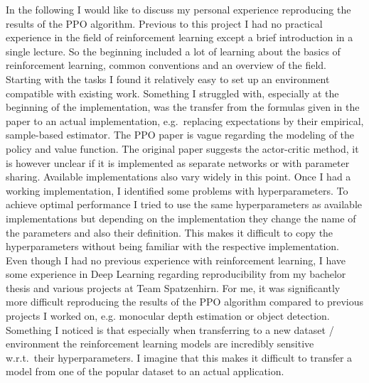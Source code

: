 In the following I would like to discuss my personal experience reproducing the results of the PPO algorithm.
Previous to this project I had no practical experience in the field of reinforcement learning except a brief introduction in a single lecture.
So the beginning included a lot of learning about the basics of reinforcement learning, common conventions and an overview of the field.
Starting with the tasks I found it relatively easy to set up an environment compatible with existing work.
Something I struggled with, especially at the beginning of the implementation, was the transfer from the formulas given in
the paper to an actual implementation, e.g.\ replacing expectations by their empirical, sample-based estimator.
The PPO paper is vague regarding the modeling of the policy and value function.
The original paper suggests the actor-critic method, it is however unclear if it is implemented as separate networks
or with parameter sharing.
Available implementations also vary widely in this point.
Once I had a working implementation, I identified some problems with hyperparameters.
To achieve optimal performance I tried to use the same hyperparameters as available implementations but depending on the
implementation they change the name of the parameters and also their definition.
This makes it difficult to copy the hyperparameters without being familiar with the respective implementation.\\
Even though I had no previous experience with reinforcement learning, I have some experience in Deep Learning
regarding reproducibility from my bachelor thesis and various projects at Team Spatzenhirn.
For me, it was significantly more difficult reproducing the results of the PPO algorithm compared to previous projects
I worked on, e.g. monocular depth estimation or object detection.
Something I noticed is that especially when transferring to a new dataset / environment the reinforcement learning
models are incredibly sensitive w.r.t.\ their hyperparameters.
I imagine that this makes it difficult to transfer a model from one of the popular dataset to an actual application.
